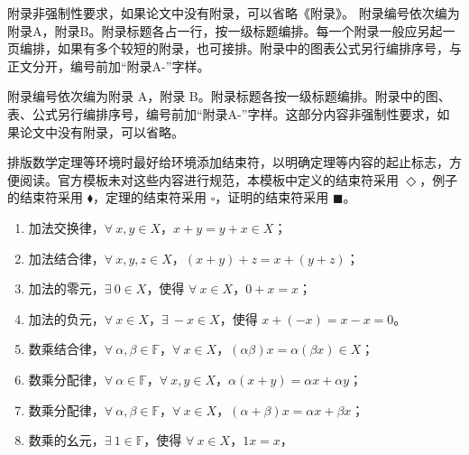 \setcounter{chapter}{1}
\renewcommand{\thefigure}{\Alph{chapter}-\arabic{figure}}
\renewcommand{\thetable}{\Alph{chapter}-\arabic{table}}
\renewcommand{\theequation}{\Alph{chapter}-\arabic{equation}}
\renewcommand{\thelstlisting}{\Alph{chapter}-\arabic{lstlisting}}
\renewcommand\thealgorithm{\Alph{chapter}-\arabic{algorithm}}
\renewcommand\thesection{\Alph{chapter}.\arabic{section}}
{
    \color{red}
    附录非强制性要求，如果论文中没有附录，可以省略《附录》。
}
附录编号依次编为附录A，附录B。附录标题各占一行，按一级标题编排。每一个附录一般应另起一页编排，如果有多个较短的附录，也可接排。附录中的图表公式另行编排序号，与正文分开，编号前加“附录A-”字样。

附录编号依次编为附录 A，附录 B。附录标题各按一级标题编排。附录中的图、表、公式另行编排序号，编号前加“附录A-”字样。这部分内容非强制性要求，如果论文中没有附录，可以省略。

排版数学定理等环境时最好给环境添加结束符，以明确定理等内容的起止标志，方便阅读。官方模板未对这些内容进行规范，本模板中定义的结束符采用 $\Diamond$，例子的结束符采用 $\blacklozenge$，定理的结束符采用 $\square$，证明的结束符采用 $\blacksquare$。

\begin{enumerate}
	\item 加法交换律，$\forall~x,y \in X$，$x+y = y+x \in X$；
	\item 加法结合律，$\forall~x,y,z \in X$，$(x+y)+z = x+(y+z)$；
	\item 加法的零元，$\exists~0 \in X$，使得 $\forall~x \in X$，$0+x = x$；
	\item 加法的负元，$\forall~x \in X$，$\exists~-x \in X$，使得 $x+(-x) = x-x = 0$。
	\item 数乘结合律，$\forall~\alpha,\beta \in \mathbb{F}$，$\forall~x \in X$，$(\alpha\beta)x = \alpha(\beta x) \in X$；
	\item 数乘分配律，$\forall~\alpha \in \mathbb{F}$，$\forall~x,y \in X$，$\alpha(x+y) = \alpha x + \alpha y$；
	\item 数乘分配律，$\forall~\alpha,\beta \in \mathbb{F}$，$\forall~x \in X$，$(\alpha+\beta)x = \alpha x + \beta x$；
	\item 数乘的幺元，$\exists~1 \in \mathbb{F}$，使得 $\forall~x \in X$，$1 x = x$，
\end{enumerate}

